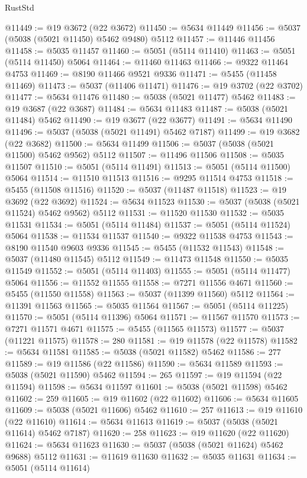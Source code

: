 \begin{lexlean}{RustStd}
\begin{coremodule}
@11449 := @19 @3672 (@22 @3672)
@11450 := @5634 @11449
@11456 := @5037 (@5038 (@5021 @11450) @5462 @9480) @5112
@11457 := @11446 @11456
@11458 := @5035 @11457
@11460 := @5051 (@5114 @11410)
@11463 := @5051 (@5114 @11450) @5064
@11464 := @11460 @11463
@11466 := @9322 @11464 @4753
@11469 := @8190 @11466 @9521 @9336
@11471 := @5455 (@11458 @11469)
@11473 := @5037 (@11406 @11471)
@11476 := @19 @3702 (@22 @3702)
@11477 := @5634 @11476
@11480 := @5038 (@5021 @11477) @5462
@11483 := @19 @3687 (@22 @3687)
@11484 := @5634 @11483
@11487 := @5038 (@5021 @11484) @5462
@11490 := @19 @3677 (@22 @3677)
@11491 := @5634 @11490
@11496 := @5037 (@5038 (@5021 @11491) @5462 @7187)
@11499 := @19 @3682 (@22 @3682)
@11500 := @5634 @11499
@11506 := @5037 (@5038 (@5021 @11500) @5462 @9562) @5112
@11507 := @11496 @11506
@11508 := @5035 @11507
@11510 := @5051 (@5114 @11491)
@11513 := @5051 (@5114 @11500) @5064
@11514 := @11510 @11513
@11516 := @9295 @11514 @4753
@11518 := @5455 (@11508 @11516)
@11520 := @5037 (@11487 @11518)
@11523 := @19 @3692 (@22 @3692)
@11524 := @5634 @11523
@11530 := @5037 (@5038 (@5021 @11524) @5462 @9562) @5112
@11531 := @11520 @11530
@11532 := @5035 @11531
@11534 := @5051 (@5114 @11484)
@11537 := @5051 (@5114 @11524) @5064
@11538 := @11534 @11537
@11540 := @9322 @11538 @4753
@11543 := @8190 @11540 @9603 @9336
@11545 := @5455 (@11532 @11543)
@11548 := @5037 (@11480 @11545) @5112
@11549 := @11473 @11548
@11550 := @5035 @11549
@11552 := @5051 (@5114 @11403)
@11555 := @5051 (@5114 @11477) @5064
@11556 := @11552 @11555
@11558 := @7271 @11556 @4671
@11560 := @5455 (@11550 @11558)
@11563 := @5037 (@11399 @11560) @5112
@11564 := @11391 @11563
@11565 := @5035 @11564
@11567 := @5051 (@5114 @11225)
@11570 := @5051 (@5114 @11396) @5064
@11571 := @11567 @11570
@11573 := @7271 @11571 @4671
@11575 := @5455 (@11565 @11573)
@11577 := @5037 (@11221 @11575)
@11578 := 280
@11581 := @19 @11578 (@22 @11578)
@11582 := @5634 @11581
@11585 := @5038 (@5021 @11582) @5462
@11586 := 277
@11589 := @19 @11586 (@22 @11586)
@11590 := @5634 @11589
@11593 := @5038 (@5021 @11590) @5462
@11594 := 265
@11597 := @19 @11594 (@22 @11594)
@11598 := @5634 @11597
@11601 := @5038 (@5021 @11598) @5462
@11602 := 259
@11605 := @19 @11602 (@22 @11602)
@11606 := @5634 @11605
@11609 := @5038 (@5021 @11606) @5462
@11610 := 257
@11613 := @19 @11610 (@22 @11610)
@11614 := @5634 @11613
@11619 := @5037 (@5038 (@5021 @11614) @5462 @7187)
@11620 := 258
@11623 := @19 @11620 (@22 @11620)
@11624 := @5634 @11623
@11630 := @5037 (@5038 (@5021 @11624) @5462 @9688) @5112
@11631 := @11619 @11630
@11632 := @5035 @11631
@11634 := @5051 (@5114 @11614)

\end{coremodule}
\end{lexlean}

